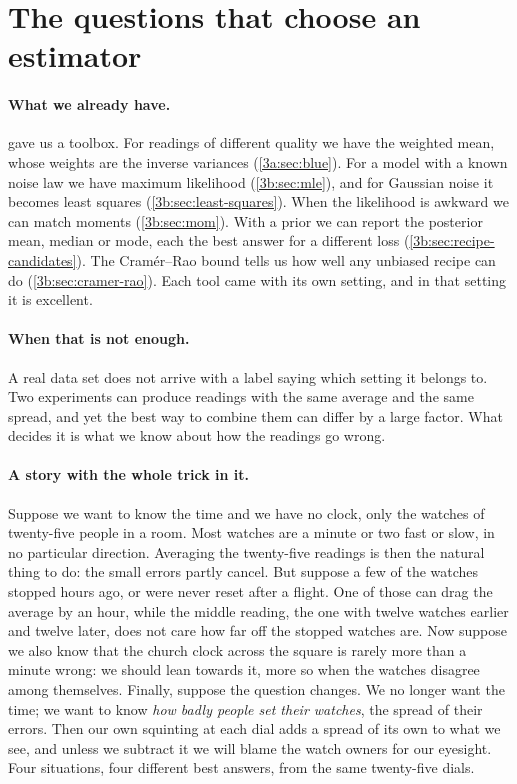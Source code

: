 \section{The questions that choose an estimator}
\label{T5a:sec:questions}

\paragraph{What we already have.}
 gave us a toolbox. For readings of different quality we have
the weighted mean, whose weights are the inverse variances
(\cref{3a:sec:blue}). For a model with a known noise law we have maximum
likelihood (\cref{3b:sec:mle}), and for Gaussian noise it becomes least
squares (\cref{3b:sec:least-squares}). When the likelihood is awkward we can
match moments (\cref{3b:sec:mom}). With a prior we can report the posterior
mean, median or mode, each the best answer for a different loss
(\cref{3b:sec:recipe-candidates}). The Cram\'er--Rao bound tells us how well
any unbiased recipe can do (\cref{3b:sec:cramer-rao}). Each tool came with
its own setting, and in that setting it is excellent.

\paragraph{When that is not enough.}
A real data set does not arrive with a label saying which setting it belongs
to. Two experiments can produce readings with the same average and the same
spread, and yet the best way to combine them can differ by a large factor.
What decides it is what we know about how the readings go wrong.

\paragraph{A story with the whole trick in it.}
Suppose we want to know the time and we have no clock, only the watches of
twenty-five people in a room. Most watches are a minute or two fast or slow,
in no particular direction. Averaging the twenty-five readings is then the
natural thing to do: the small errors partly cancel. But suppose a few of
the watches stopped hours ago, or were never reset after a flight. One of
those can drag the average by an hour, while the middle reading, the one
with twelve watches earlier and twelve later, does not care how far off the
stopped watches are. Now suppose we also know that the church clock across
the square is rarely more than a minute wrong: we should lean towards it,
more so when the watches disagree among themselves. Finally, suppose the
question changes. We no longer want the time; we want to know \emph{how
badly people set their watches}, the spread of their errors. Then our own
squinting at each dial adds a spread of its own to what we see, and unless
we subtract it we will blame the watch owners for our eyesight. Four
situations, four different best answers, from the same twenty-five dials.

